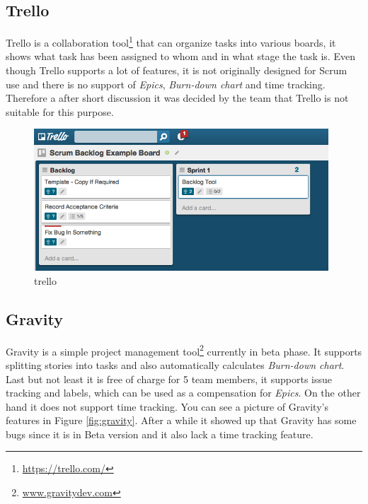 \subsection{Trello}
\label{subsec:TrelloToolDescription}
Trello is a collaboration tool\footnote{\url{https://trello.com/}} that can organize tasks into various boards, it shows what task has been assigned to whom and in what stage the task is.
Even though Trello supports a lot of features, it is not originally designed for Scrum use and there is no support of \emph{Epics}, \emph{Burn-down chart} and time tracking. 
Therefore a after short discussion it was decided by the team that Trello is not suitable for this purpose.
\begin{figure}[H]
    \centering
        \includegraphics[width=11cm]{preliminaryStudies/trello.png}
    \caption{trello}
    \label{fig:trello}
\end{figure}

\subsection{Gravity} 
\label{subsec:GravityToolDescription}
Gravity is a simple project management tool\footnote{\url{www.gravitydev.com}} currently in beta phase.
It supports splitting stories into tasks and also automatically calculates \emph{Burn-down chart}. 
Last but not least it is free of charge for 5 team members, it supports issue tracking and labels, which can be used as a compensation for \emph{Epics}.
On the other hand it does not support time tracking.
You can see a picture of Gravity's features in Figure \ref{fig:gravity}. After a while it showed up that Gravity has some bugs since it is in Beta version and it also lack a time tracking feature.

